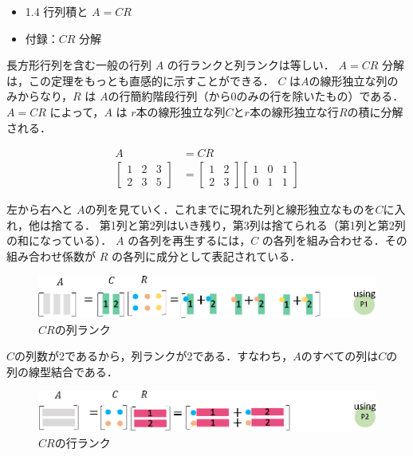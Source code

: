 \documentclass[letterpaper]{article}
\begin{document}
\begin{itemize}
  \item 1.4 行列積と $A=CR$
  \item 付録：$CR$ 分解
\end{itemize}

長方形行列を含む一般の行列 $A$ の行ランクと列ランクは等しい．
$A=CR$ 分解は，この定理をもっとも直感的に示すことができる．
$C$ は$A$の線形独立な列のみからなり，$R$ は $A$の行簡約階段行列（から0のみの行を除いたもの）である．
$A=CR$ によって，$A$ は $r$本の線形独立な列$C$と$r$本の線形独立な行$R$の積に分解される．

\begin{equation*}
  \begin{split}
    A &= CR\\
  \begin{bmatrix}
    1 & 2 & 3 \\
    2 & 3 & 5
  \end{bmatrix}
  & =
  \begin{bmatrix}
    1 & 2 \\
    2 & 3
  \end{bmatrix}
  \begin{bmatrix}
    1 & 0 & 1 \\
    0 & 1 & 1
  \end{bmatrix}
\end{split}
\end{equation*}

左から右へと $A$の列を見ていく．これまでに現れた列と線形独立なものを$C$に入れ，他は捨てる．
第1列と第2列はいき残り，第3列は捨てられる（第1列と第2列の和になっている）．
$A$ の各列を再生するには，$C$ の各列を組み合わせる．その組み合わせ係数が $R$ の各列に成分として表記されている．

\begin{figure}[H]
  \includegraphics[keepaspectratio, width=\linewidth]{CR1-j.eps}
  \caption{$CR$の列ランク}
\end{figure}

$C$の列数が2であるから，列ランクが2である．すなわち，$A$のすべての列は$C$の列の線型結合である．

\begin{figure}[H]
  \includegraphics[keepaspectratio, width=\linewidth]{CR2-j.eps}
  \caption{$CR$の行ランク}
\end{figure}
\end{document}
